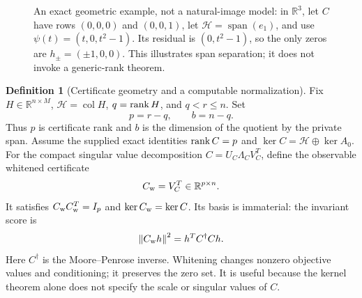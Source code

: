 \documentclass[11pt,a4paper]{article}
\theoremstyle{definition}
\theoremstyle{definition}
\newtheorem{definition}[theorem]{Definition}
\theoremstyle{remark}\newtheorem{remark}[theorem]{Remark}
\newcommand{\R}{\mathbb R}\newcommand{\Prob}{\mathbb P}\newcommand{\E}{\mathbb E}
\newcommand{\HH}{\mathcal H}\newcommand{\XX}{\mathcal X}\newcommand{\col}{\operatorname{col}}
\newcommand{\norm}[1]{\left\lVert #1\right\rVert}
\begin{document}
\begin{figure}[htbp]
\centering
{}
\caption{An exact geometric example, not a natural-image model: in $\R^3$, let $C$ have rows $(0,0,0)$ and $(0,0,1)$, let $\HH=\operatorname{span}(e_1)$, and use $\psi(t)=(t,0,t^2-1)$. Its residual is $(0,t^2-1)$, so the only zeros are $h_\pm=(\pm1,0,0)$. This illustrates span separation; it does not invoke a generic-rank theorem.}
\label{fig:kernelgeometry}
\end{figure}
\FloatBarrier

\begin{definition}[Certificate geometry and a computable normalization]\label{def:cert}
Fix $H\in\R^{n\times M}$, $\HH=\col H$, $q=\operatorname{rank} H$, and $q<r\le n$. Set
\[
p=r-q,\qquad b=n-q.
\]
Thus $p$ is certificate rank and $b$ is the dimension of the quotient by the private span. Assume the supplied exact identities $\operatorname{rank} C=p$ and $\ker C=\HH\oplus\ker A_0$. For the compact singular value decomposition $C=U_C\Lambda_C V_C^T$, define the observable whitened certificate
\[
C_{\rm w}=V_C^T\in\R^{p\times n}.
\]
It satisfies $C_{\rm w}C_{\rm w}^T=I_p$ and $\ker C_{\rm w}=\ker C$. Its basis is immaterial: the invariant score is
\[
\norm{C_{\rm w}h}^2=h^T C^\dagger C h.
\]
Here $C^\dagger$ is the Moore--Penrose inverse. Whitening changes nonzero objective values and conditioning; it preserves the zero set. It is useful because the kernel theorem alone does not specify the scale or singular values of $C$.
\end{definition}
\end{document}
